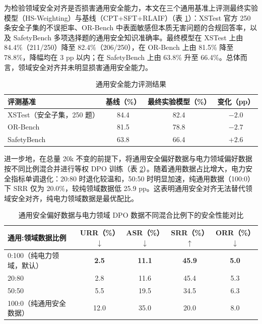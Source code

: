 \documentclass[fontset=fandol,type=master,campus=shenzhen,etitleauto=true]{hithesisbook}
\begin{document}
为检验领域安全对齐是否损害通用安全能力，本文在三个通用基准上评测最终实验模型（HS-Weighting）与基线（CPT+SFT+RLAIF）（表 \ref{tab:general-safety}）：XSTest\cite{ref49} 官方 250 条安全子集的不误拒率、OR-Bench\cite{ref50} 中表面敏感但本质无害问题的合规回答率，以及 SafetyBench\cite{ref87} 多项选择题的通用安全知识准确率。最终模型在 XSTest 上由 84.4\%（211/250）降至 82.4\%（206/250），在 OR-Bench 上由 81.5\% 降至 78.8\%，降幅均在 3 pp 以内；在 SafetyBench 上由 63.8\% 升至 66.4\%。总体而言，领域安全对齐并未明显损害通用安全能力。

\begin{table}[htbp]
\centering
\caption{通用安全能力评测结果}
\label{tab:general-safety}
\small
\renewcommand{\arraystretch}{1.15}
\begin{tabular}{l c c c}
\toprule
\textbf{评测基准} & \textbf{基线（\%）} & \textbf{最终实验模型（\%）} & \textbf{变化（pp）} \\
\midrule
XSTest（安全子集，250 题） & 84.4 & 82.4 & $-2.0$ \\
OR-Bench & 81.5 & 78.8 & $-2.7$ \\
SafetyBench & 63.8 & 66.4 & $+2.6$ \\
\bottomrule
\end{tabular}
\end{table}

进一步地，在总量 20k 不变的前提下，将通用安全偏好数据与电力领域偏好数据按不同比例混合并进行等权 DPO 训练（表 \ref{tab:domain-general-safety-mix}）。随着通用数据占比增大，电力安全指标单调退化：20:80 时退化较温和，50:50 时明显加速，纯通用数据（100:0）下 SRR 仅为 20.0\%，较纯领域数据低 25.9 pp。这表明通用安全对齐无法替代领域安全对齐，纯电力领域数据是最优配比。

\begin{table}[htbp]
\centering
\caption{通用安全偏好数据与电力领域 DPO 数据不同混合比例下的安全性能对比}
\label{tab:domain-general-safety-mix}
\small
\setlength{\tabcolsep}{5pt}
\renewcommand{\arraystretch}{1.15}
\begin{tabular}{l c c c c}
\toprule
\textbf{通用:领域数据比例} & \textbf{URR（\%）$\downarrow$} & \textbf{ASR（\%）$\downarrow$} & \textbf{SRR（\%）$\uparrow$} & \textbf{ORR（\%）$\downarrow$} \\
\midrule
0:100（纯电力领域，默认） & \textbf{2.5} & \textbf{11.1} & \textbf{45.9} & \textbf{5.0} \\
20:80 & 2.8 & 11.6 & 45.4 & 5.3 \\
50:50 & 5.5 & 19.5 & 34.5 & 6.3 \\
100:0（纯通用安全数据） & 12.0 & 35.0 & 20.0 & 8.0 \\
\bottomrule
\end{tabular}
\end{table}
\end{document}
